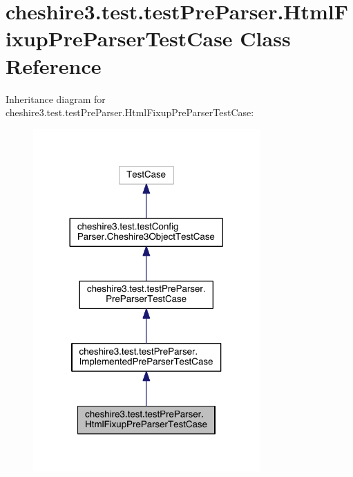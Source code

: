 \hypertarget{classcheshire3_1_1test_1_1test_pre_parser_1_1_html_fixup_pre_parser_test_case}{\section{cheshire3.\-test.\-test\-Pre\-Parser.\-Html\-Fixup\-Pre\-Parser\-Test\-Case Class Reference}
\label{classcheshire3_1_1test_1_1test_pre_parser_1_1_html_fixup_pre_parser_test_case}
}


Inheritance diagram for cheshire3.\-test.\-test\-Pre\-Parser.\-Html\-Fixup\-Pre\-Parser\-Test\-Case\-:
\nopagebreak
\begin{figure}[H]
\begin{center}
\leavevmode
\includegraphics[width=246pt]{classcheshire3_1_1test_1_1test_pre_parser_1_1_html_fixup_pre_parser_test_case__inherit__graph}
\end{center}
\end{figure}


